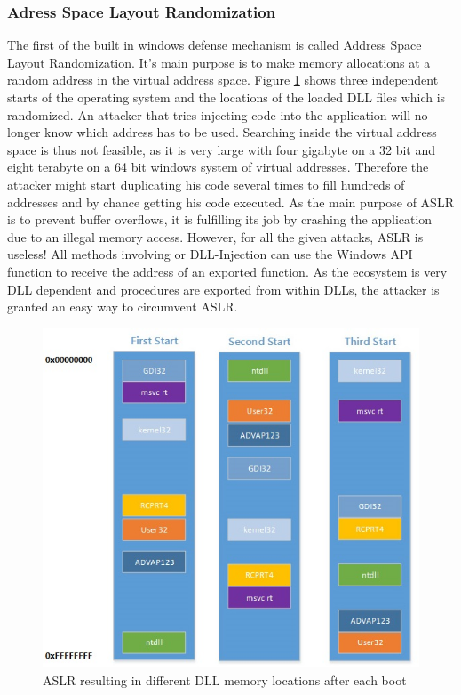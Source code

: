 \subsubsection{Adress Space Layout Randomization}
The first of the built in windows defense mechanism is called Address Space Layout Randomization. It's main purpose is to make memory allocations at a random address in the virtual address space. Figure \ref{fig:aslr} shows three independent starts of the operating system and the locations of the loaded DLL files which is randomized. An attacker that tries injecting code into the application will no longer know which address has to be used. Searching inside the virtual address space is thus not feasible, as it is very large with four gigabyte on a 32 bit and eight terabyte on a 64 bit windows system of virtual addresses. Therefore the attacker might start duplicating his code several times to fill hundreds of addresses and by chance getting his code executed. As the main purpose of ASLR is to prevent buffer overflows, it is fulfilling its job by crashing the application due to an illegal memory access. However, for all the given attacks, ASLR is useless! All methods involving  or DLL-Injection can use the Windows API function  to receive the address of an exported function. As the ecosystem is very DLL dependent and procedures are exported from within DLLs, the attacker is granted an easy way to circumvent ASLR.
\begin{figure}[h]
\centering
\includegraphics[width=\textwidth,height=\textheight,keepaspectratio]{sections/background/defenses/aslr.jpg}
\caption{ASLR resulting in different DLL memory locations after each boot}
\label{fig:aslr}
\end{figure}